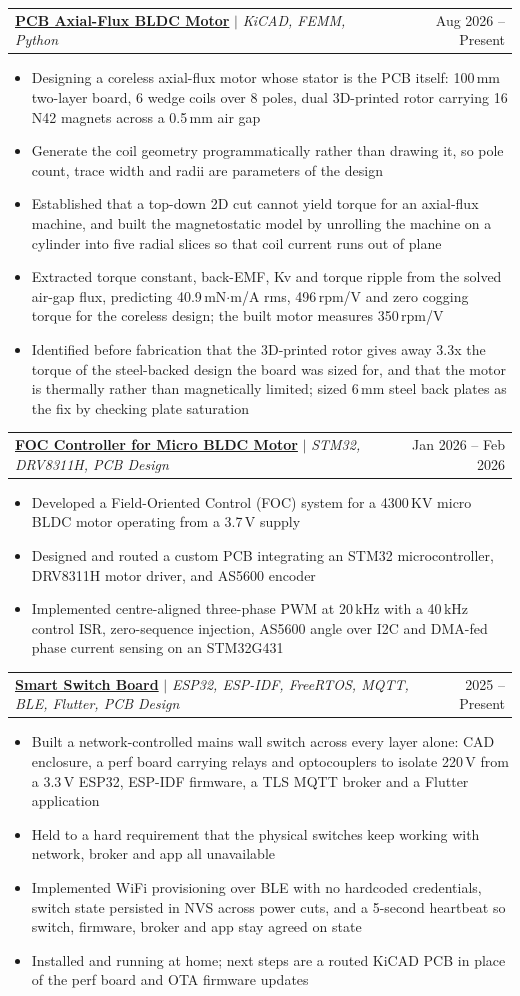 \documentclass[a4paper,11pt]{article}
\makeatletter
\newcommand{\resumeItem}[1]{
  \item\small{
    {#1 \vspace{-2pt}}
  }
}
\newcommand{\resumeProjectHeading}[2]{
    \item
    \begin{tabular*}{0.97\textwidth}{l@{\extracolsep{\fill}}r}
      \small#1 & #2 \\
    \end{tabular*}\vspace{-7pt}
}
\newcommand{\resumeItemListStart}{\begin{itemize}}
\newcommand{\resumeItemListEnd}{\end{itemize}\vspace{-7pt}}
\makeatother
\begin{document}
    \resumeProjectHeading
      {\textbf{\href{https://spongefal.vercel.app/projects/axial-flux-motor/}{PCB Axial-Flux BLDC Motor}} $|$ \emph{KiCAD, FEMM, Python}}{Aug 2026 -- Present}
      \resumeItemListStart
        \resumeItem{Designing a coreless axial-flux motor whose stator is the PCB itself: 100\,mm two-layer board, 6 wedge coils over 8 poles, dual 3D-printed rotor carrying 16 N42 magnets across a 0.5\,mm air gap}
        \resumeItem{Generate the coil geometry programmatically rather than drawing it, so pole count, trace width and radii are parameters of the design}
        \resumeItem{Established that a top-down 2D cut cannot yield torque for an axial-flux machine, and built the magnetostatic model by unrolling the machine on a cylinder into five radial slices so that coil current runs out of plane}
        \resumeItem{Extracted torque constant, back-EMF, Kv and torque ripple from the solved air-gap flux, predicting 40.9\,mN$\cdot$m/A rms, 496\,rpm/V and zero cogging torque for the coreless design; the built motor measures 350\,rpm/V}
        \resumeItem{Identified before fabrication that the 3D-printed rotor gives away 3.3x the torque of the steel-backed design the board was sized for, and that the motor is thermally rather than magnetically limited; sized 6\,mm steel back plates as the fix by checking plate saturation}
      \resumeItemListEnd

    \resumeProjectHeading
      {\textbf{\href{https://github.com/NoobMaster-version/Field-Orient-Control-for-BLDC-Motor}{FOC Controller for Micro BLDC Motor}} $|$ \emph{STM32, DRV8311H, PCB Design}}{Jan 2026 -- Feb 2026}
      \resumeItemListStart
        \resumeItem{Developed a Field-Oriented Control (FOC) system for a 4300\,KV micro BLDC motor operating from a 3.7\,V supply}
        \resumeItem{Designed and routed a custom PCB integrating an STM32 microcontroller, DRV8311H motor driver, and AS5600 encoder}
        \resumeItem{Implemented centre-aligned three-phase PWM at 20\,kHz with a 40\,kHz control ISR, zero-sequence injection, AS5600 angle over I2C and DMA-fed phase current sensing on an STM32G431}
      \resumeItemListEnd

    \resumeProjectHeading
      {\textbf{\href{https://spongefal.vercel.app/projects/smart-switch/}{Smart Switch Board}} $|$ \emph{ESP32, ESP-IDF, FreeRTOS, MQTT, BLE, Flutter, PCB Design}}{2025 -- Present}
      \resumeItemListStart
        \resumeItem{Built a network-controlled mains wall switch across every layer alone: CAD enclosure, a perf board carrying relays and optocouplers to isolate 220\,V from a 3.3\,V ESP32, ESP-IDF firmware, a TLS MQTT broker and a Flutter application}
        \resumeItem{Held to a hard requirement that the physical switches keep working with network, broker and app all unavailable}
        \resumeItem{Implemented WiFi provisioning over BLE with no hardcoded credentials, switch state persisted in NVS across power cuts, and a 5-second heartbeat so switch, firmware, broker and app stay agreed on state}
        \resumeItem{Installed and running at home; next steps are a routed KiCAD PCB in place of the perf board and OTA firmware updates}
      \resumeItemListEnd
\end{document}
